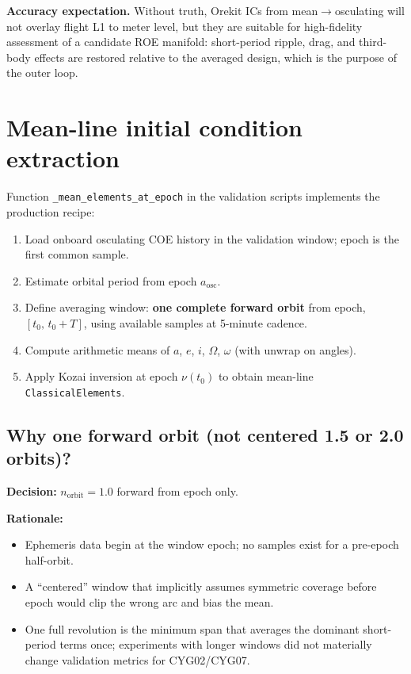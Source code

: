 \documentclass[11pt]{article}
\begin{document}
\textbf{Accuracy expectation.} Without truth, Orekit ICs from mean$\to$osculating will not overlay flight L1 to meter level, but they are suitable for high-fidelity assessment of a candidate ROE manifold: short-period ripple, drag, and third-body effects are restored relative to the averaged design, which is the purpose of the outer loop.

\section{Mean-line initial condition extraction}

Function \texttt{\_mean\_elements\_at\_epoch} in the validation scripts implements the production recipe:

\begin{enumerate}
    \item Load onboard osculating COE history in the validation window; epoch is the first common sample.
    \item Estimate orbital period from epoch $a_\mathrm{osc}$.
    \item Define averaging window: \textbf{one complete forward orbit} from epoch, $[t_0,\, t_0 + T]$, using available samples at 5-minute cadence.
    \item Compute arithmetic means of $a$, $e$, $i$, $\Omega$, $\omega$ (with unwrap on angles).
    \item Apply Kozai inversion at epoch $\nu(t_0)$ to obtain mean-line \texttt{ClassicalElements}.
\end{enumerate}

\subsection{Why one forward orbit (not centered 1.5 or 2.0 orbits)?}

\textbf{Decision:} $n_\mathrm{orbit} = 1.0$ forward from epoch only.

\textbf{Rationale:}
\begin{itemize}
    \item Ephemeris data begin at the window epoch; no samples exist for a pre-epoch half-orbit.
    \item A ``centered'' window that implicitly assumes symmetric coverage before epoch would clip the wrong arc and bias the mean.
    \item One full revolution is the minimum span that averages the dominant short-period terms once; experiments with longer windows did not materially change validation metrics for CYG02/CYG07.
\end{itemize}
\end{document}
